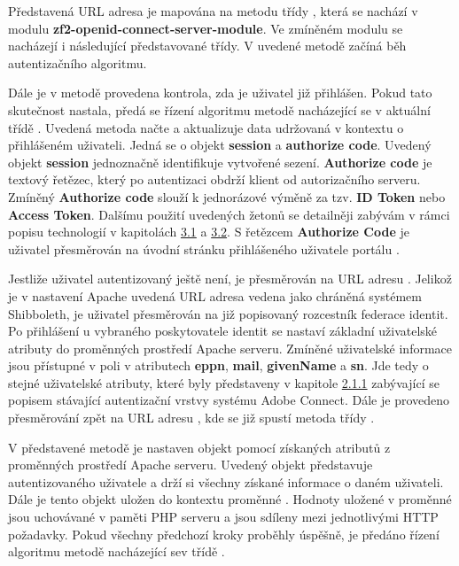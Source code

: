 \documentclass[
  printed, %
  twoside, %
  table,   %
  nolof,     %
  nolot,     %
]{fithesis3}
\begin{document}
Představená URL adresa je mapována na metodu  třídy , která se nachází v modulu \textbf{zf2-openid-connect-server-module}. Ve zmíněném modulu  se nacházejí i následující představované třídy. V uvedené metodě  začíná běh autentizačního algoritmu. \par 

Dále je v metodě  provedena kontrola, zda je uživatel již přihlášen. Pokud tato skutečnost nastala, předá se řízení algoritmu metodě  nacházející se v aktuální třídě . Uvedená metoda načte a aktualizuje data udržovaná v kontextu o přihlášeném uživateli. Jedná se o objekt \textbf{session} a \textbf{authorize code}. Uvedený objekt \textbf{session} jednoznačně identifikuje vytvořené sezení. \textbf{Authorize code} je textový řetězec, který po autentizaci obdrží klient od autorizačního serveru. Zmíněný \textbf{Authorize code} slouží k jednorázové výměně za tzv. \textbf{ID Token} nebo \textbf{Access Token}. Dalšímu použití uvedených žetonů se detailněji zabývám v rámci popisu technologií v kapitolách \hyperref[sec:oauth]{3.1} a \hyperref[sec:oidc]{3.2}. S řetězcem \textbf{Authorize Code} je uživatel přesměrován na úvodní stránku přihlášeného uživatele portálu . \par 

Jestliže uživatel autentizovaný ještě není, je přesměrován na URL adresu . Jelikož je v nastavení Apache uvedená URL adresa vedena jako chráněná systémem Shibboleth, je uživatel přesměrován na již popisovaný rozcestník federace identit. Po přihlášení u vybraného poskytovatele identit se nastaví základní uživatelské atributy do proměnných prostředí Apache serveru. Zmíněné uživatelské informace jsou přístupné v poli  v atributech \textbf{eppn}, \textbf{mail}, \textbf{givenName} a \textbf{sn}. Jde tedy o stejné uživatelské atributy, které byly představeny v kapitole \hyperref[item:adobe-connect]{2.1.1} zabývající se popisem stávající autentizační vrstvy systému Adobe Connect. Dále je provedeno přesměrování zpět na URL adresu , kde se již spustí metoda  třídy . \par

V představené metodě  je nastaven objekt  pomocí získaných atributů z proměnných prostředí Apache serveru. Uvedený objekt představuje autentizovaného uživatele a drží si všechny získané informace o daném uživateli. Dále je tento objekt uložen do kontextu proměnné . Hodnoty uložené v proměnné  jsou uchovávané v paměti PHP serveru a jsou sdíleny mezi jednotlivými HTTP požadavky. Pokud všechny předchozí kroky proběhly úspěšně, je předáno řízení algoritmu metodě  nacházející se\break v třídě . \par
\end{document}
